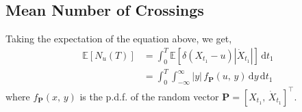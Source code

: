 \documentclass[journal]{IEEEtran}
\theoremstyle{plain}
\theoremstyle{definition}
\theoremstyle{remark}
\newcommand{\E}{\mathbb{E}}
\newcommand{\Nu}{N_u(T)}
\newcommand{\dd}{\mathrm{d}}
\begin{document}
\subsection{Mean Number of Crossings}
Taking the expectation of the equation above, we get,
\begin{equation}
\begin{split}
    \E\left[\Nu\right] &= \int_0^T \E\left[\delta\left(X_{t_1} - u\right) \left|\dot{X}_{t_1}\right|  \right] \, \dd t_1 \\
    &= \int_0^T \int_{-\infty}^\infty |y|\, f_{\mathbf{P}}(u,\,y) \, \dd y \, \dd t_1
\end{split} \label{eq:rice_formula_crossings1}
\end{equation}
where $f_{\mathbf{P}}(x,\,y)$ is the p.d.f. of the random vector $\mathbf{P} = [X_{t_1}, \, \dot{X}_{t_1}]^\top$.
\end{document}
